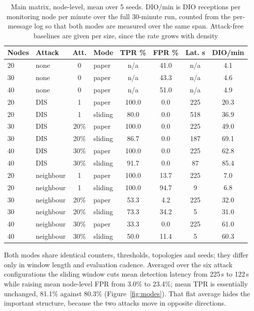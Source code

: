 \documentclass[11pt, a4paper]{article}
\begin{document}
\begin{table}[H]
  \centering \small
  \begin{tabularx}{0.95\textwidth}{llcXcccc}
    \toprule
    \textbf{Nodes} & \textbf{Attack} & \textbf{Att.} & \textbf{Mode} & \textbf{TPR \%} & \textbf{FPR \%} & \textbf{Lat. s} & \textbf{DIO/min} \\
    \midrule
    20 & none      & 0    & paper   & n/a   & 41.0 & n/a & 4.1 \\
    30 & none      & 0    & paper   & n/a   & 43.3 & n/a & 4.6 \\
    40 & none      & 0    & paper   & n/a   & 51.0 & n/a & 4.9 \\
    \midrule
    20 & DIS       & 1    & paper   & 100.0 & 0.0  & 225 & 20.3 \\
    20 & DIS       & 1    & sliding & 80.0  & 0.0  & 518 & 36.9 \\
    30 & DIS       & 20\% & paper   & 100.0 & 0.0  & 225 & 49.0 \\
    30 & DIS       & 20\% & sliding & 86.7  & 0.0  & 187 & 69.1 \\
    40 & DIS       & 30\% & paper   & 100.0 & 0.0  & 225 & 62.8 \\
    40 & DIS       & 30\% & sliding & 91.7  & 0.0  & 87  & 85.4 \\
    \midrule
    20 & neighbour & 1    & paper   & 100.0 & 13.7 & 225 & 7.0 \\
    20 & neighbour & 1    & sliding & 100.0 & 94.7 & 9   & 6.8 \\
    30 & neighbour & 20\% & paper   & 53.3  & 4.2  & 225 & 32.0 \\
    30 & neighbour & 20\% & sliding & 73.3  & 34.2 & 5   & 31.0 \\
    40 & neighbour & 30\% & paper   & 33.3  & 0.0  & 225 & 61.0 \\
    40 & neighbour & 30\% & sliding & 50.0  & 11.4 & 5   & 60.3 \\
    \bottomrule
  \end{tabularx}
  \caption{Main matrix, node-level, mean over 5 seeds. DIO/min is DIO receptions per monitoring node per minute over the full 30-minute run, counted from the per-message log so that both modes are measured over the same span. Attack-free baselines are given per size, since the rate grows with density}
  \label{tab:main}
\end{table}

Both modes share identical counters, thresholds, topologies and seeds; they differ only in window length and evaluation cadence. Averaged over the six attack configurations the sliding window cuts mean detection latency from 225\,s to 122\,s while raising mean node-level FPR from 3.0\% to 23.4\%; mean TPR is essentially unchanged, 81.1\% against 80.3\% (Figure~\ref{fig:modes}). That flat average hides the important structure, because the two attacks move in opposite directions.
\end{document}
